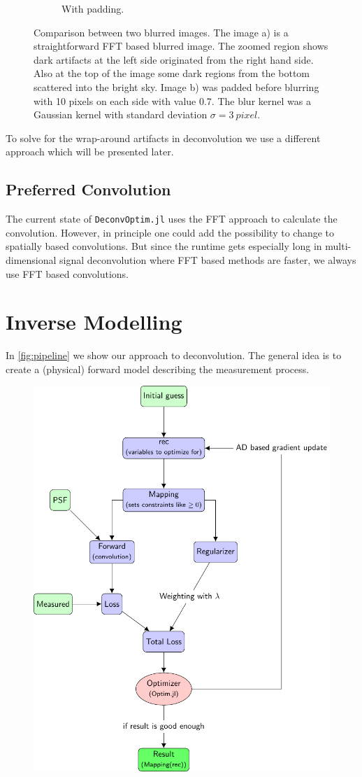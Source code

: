 \documentclass{juliacon}
\begin{document}
\begin{figure}[h]
\begin{subfigure}[b]{.25\textwidth}
            \caption{With padding.}
            \label{fig:withpad}
        \end{subfigure}
        \caption{Comparison between two blurred images. The image a) is a straightforward FFT based blurred image.
        The zoomed region shows dark artifacts at the left side originated from the right hand side. Also at the top of the image some dark regions from
        the bottom scattered into the bright sky.
        Image b) was padded before blurring with 10 pixels on each side with value 0.7. The blur kernel was a Gaussian kernel
        with standard deviation $\sigma=\SI{3}{pixel}$.}
        \label{fig:}
    \end{figure}
    To solve for the wrap-around artifacts in deconvolution we use a different approach which will be presented later. 
\subsection{Preferred Convolution}
The current state of \verb|DeconvOptim.jl| uses the FFT approach to calculate the convolution.
However, in principle one could add the possibility to change to spatially based convolutions.
But since the runtime gets especially long in multi-dimensional signal deconvolution where FFT based methods
are faster, we always use FFT based convolutions. 
   
\section{Inverse Modelling}
In \autoref{fig:pipeline} we show our approach to deconvolution.
The general idea is to create a (physical) forward model describing the measurement process.
\begin{figure}[h]
    \centering
    \includegraphics[width = .5\textwidth]{figures/pipeline.pdf}
    \caption{}
    \label{fig:pipeline}
\end{figure}
\end{document}
